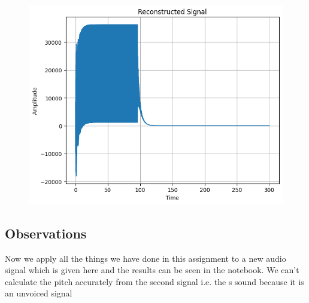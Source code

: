 \documentclass{article}
\begin{document}
\begin{figure}[H]
\begin{center}
\includegraphics[scale = 0.8]{rec2.png}
\end{center}
\end{figure}

\subsection{Observations}
Now we apply all the things we have done in this assignment to a new audio signal which is given here and the results can be seen in the notebook. We can't calculate the pitch accurately from the second signal i.e. the s sound because it is an unvoiced signal
\end{document}

